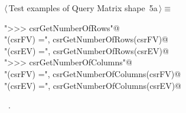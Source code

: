 \documentclass[11pt,oneside]{article}	%
\begin{document}
\begin{flushleft} \small
\begin{minipage}{\linewidth} \label{scrap9}
\protect{}$\langle\,$Test examples of Query Matrix shape\nobreak\ {\footnotesize 5a}$\,\rangle\equiv$
\vspace{-1ex}
\begin{list}{}{} \item
\mbox{}\verb@print "\n>>> csrGetNumberOfRows"@\\
\mbox{}\verb@print "\ncsrGetNumberOfRows(csrFV) =", csrGetNumberOfRows(csrFV)@\\
\mbox{}\verb@print "\ncsrGetNumberOfRows(csrEV) =", csrGetNumberOfRows(csrEV)@\\
\mbox{}\verb@print "\n>>> csrGetNumberOfColumns"@\\
\mbox{}\verb@print "\ncsrGetNumberOfColumns(csrFV) =", csrGetNumberOfColumns(csrFV)@\\
\mbox{}\verb@print "\ncsrGetNumberOfColumns(csrEV) =", csrGetNumberOfColumns(csrEV)@\\
\mbox{}\verb@@{\NWsep}
\end{list}
\vspace{-1ex}
\footnotesize\addtolength{\baselineskip}{-1ex}
\begin{list}{}{\setlength{\itemsep}{-\parsep}\setlength{\itemindent}{-\leftmargin}}
\item \NWtxtMacroRefIn\ .
\end{list}
\end{minipage}\\[4ex]
\end{flushleft}
\end{document}
